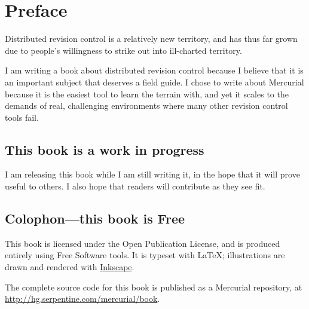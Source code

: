 \chapter*{Preface}
\label{chap:preface}

Distributed revision control is a relatively new territory, and has
thus far grown due to people's willingness to strike out into
ill-charted territory.

I am writing a book about distributed revision control because I
believe that it is an important subject that deserves a field guide.
I chose to write about Mercurial because it is the easiest tool to
learn the terrain with, and yet it scales to the demands of real,
challenging environments where many other revision control tools fail.

\section{This book is a work in progress}

I am releasing this book while I am still writing it, in the hope that
it will prove useful to others.  I also hope that readers will
contribute as they see fit.

\section{Colophon---this book is Free}

This book is licensed under the Open Publication License, and is
produced entirely using Free Software tools.  It is typeset with
\LaTeX{}; illustrations are drawn and rendered with
\href{http://www.inkscape.org/}{Inkscape}.

The complete source code for this book is published as a Mercurial
repository, at \url{http://hg.serpentine.com/mercurial/book}.

